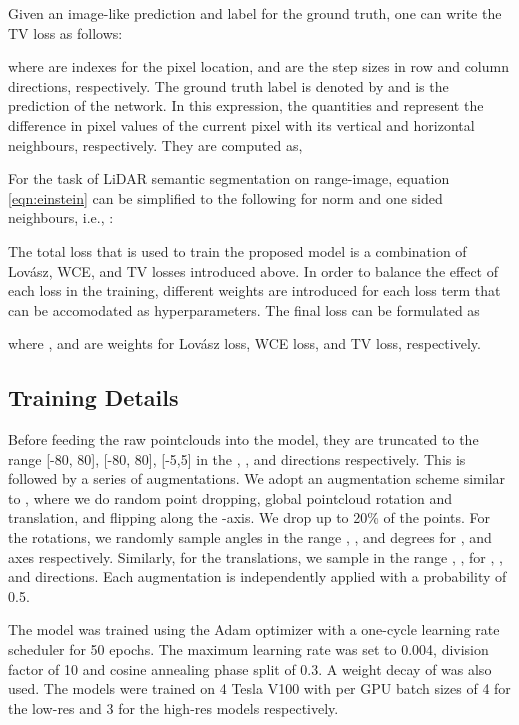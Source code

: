 \documentclass{article}
\begin{document}
Given an image-like prediction and label for the ground truth, one can write the TV loss as follows:




\noindent where  are indexes for the pixel location,  and  are the step sizes in row and column directions, respectively. The ground truth label is denoted by   and  is the prediction of the network. 
In this expression, the quantities   and  represent the difference in pixel values of the current pixel with its vertical and horizontal neighbours, respectively. They are computed as,

\vspace{-1mm}


For the task of LiDAR semantic segmentation on range-image,  equation \ref{eqn:einstein} can be simplified to the following for  norm and one sided neighbours, i.e., : 




The total loss that is used to train the proposed model is a combination of Lov\'asz, WCE, and TV losses introduced above. In order to balance the effect of each loss in the training, different weights are introduced for each loss term that can be accomodated as hyperparameters. The final loss can be formulated as

where ,  and  are weights for Lov\'asz loss, WCE loss, and TV loss, respectively.





\subsection{Training Details}



Before feeding the raw pointclouds  into the model, they are truncated to the range [-80, 80], [-80, 80], [-5,5] in the , , and  directions respectively. This is followed by a series of augmentations. We adopt an augmentation scheme similar to \cite{cortinhal2020salsanext}, where we do random point dropping, global pointcloud rotation and translation, and flipping along the -axis. 
We drop up to 20\% of the points. For the rotations, we randomly sample angles in the range , , and  degrees for ,  and  axes respectively. Similarly, for the translations, we sample in the range , ,  for , , and  directions. Each augmentation is independently applied with a probability of 0.5.

The model was trained using the Adam optimizer with a one-cycle learning rate scheduler for 50 epochs. The maximum learning rate was set to 0.004, division factor of 10 and cosine annealing phase split of 0.3. A weight decay of  was also used. The models were trained on 4 Tesla V100 with per GPU batch sizes of 4 for the low-res and 3 for the high-res models respectively.
\end{document}
